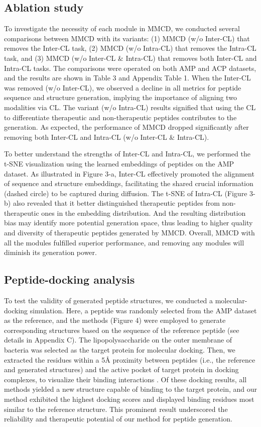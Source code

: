\documentclass[letterpaper]{article} %
\begin{document}
\subsection{Ablation study}
To investigate the necessity of each module in MMCD, we conducted several comparisons between MMCD with its variants: (1) MMCD (w/o Inter-CL) that removes the Inter-CL task, (2) MMCD (w/o Intra-CL) that removes the Intra-CL task, and (3) MMCD (w/o Inter-CL \& Intra-CL) that removes both Inter-CL and Intra-CL tasks. The comparisons were operated on both AMP and ACP datasets, and the results are shown in Table 3 and Appendix Table 1. When the Inter-CL was removed (w/o Inter-CL), we observed a decline in all metrics for peptide sequence and structure generation, implying the importance of aligning two modalities via CL. The variant (w/o Intra-CL) results signified that using the CL to differentiate therapeutic and non-therapeutic peptides contributes to the generation. As expected, the performance of MMCD dropped significantly after removing both Inter-CL and Intra-CL (w/o Inter-CL \& Intra-CL). 

To better understand the strengths of Inter-CL and Intra-CL, we performed the t-SNE \citep{tsne} visualization using the learned embeddings of peptides on the AMP dataset. As illustrated in Figure 3-a, Inter-CL effectively promoted the alignment of sequence and structure embeddings, facilitating the shared crucial information (dashed circle) to be captured during diffusion. The t-SNE of Intra-CL (Figure 3-b) also revealed that it better distinguished therapeutic peptides from non-therapeutic ones in the embedding distribution. And the resulting distribution bias may identify more potential generation space, thus leading to higher quality and diversity of therapeutic peptides generated by MMCD. Overall, MMCD with all the modules fulfilled superior performance, and removing any modules will diminish its generation power. 

\subsection{Peptide-docking analysis}
To test the validity of generated peptide structures, we conducted a molecular-docking simulation. Here, a peptide was randomly selected from the AMP dataset as the reference, and the methods (Figure 4) were employed to generate corresponding structures based on the sequence of the reference peptide (see details in Appendix C). The lipopolysaccharide on the outer membrane of bacteria \cite{liStructuralBasis2019} was selected as the target protein for molecular docking. Then, we extracted the residues within a 5Å proximity between peptides (i.e., the reference and generated structures) and the active pocket of target protein in docking complexes, to visualize their binding interactions \cite{millerReliableAccurate2021}. Of these docking results, all methods yielded a new structure capable of binding to the target protein, and our method exhibited the highest docking scores and displayed binding residues most similar to the reference structure. This prominent result underscored the reliability and therapeutic potential of our method for peptide generation.
\end{document}
